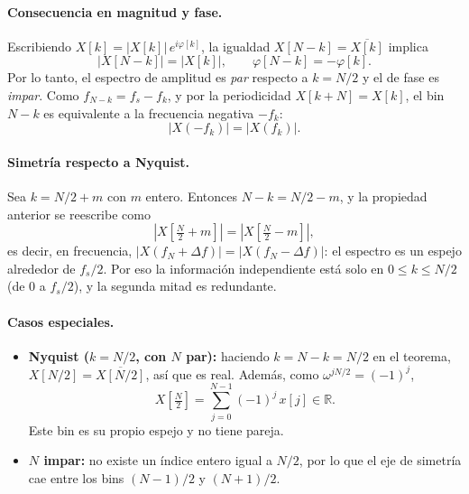 \documentclass[12pt]{article}
\begin{document}
\paragraph{Consecuencia en magnitud y fase.} Escribiendo $X[k] = |X[k]|\,e^{i\varphi[k]}$, la igualdad $X[N-k]=\overline{X[k]}$ implica
\begin{equation}
|X[N-k]| = |X[k]|, \qquad \varphi[N-k] = -\varphi[k].
\end{equation}
Por lo tanto, el espectro de amplitud es \emph{par} respecto a $k=N/2$ y el de fase es \emph{impar}. Como $f_{N-k} = f_s - f_k$, y por la periodicidad $X[k+N]=X[k]$, el bin $N-k$ es equivalente a la frecuencia negativa $-f_k$:
\begin{equation}
|X(-f_k)| = |X(f_k)|.
\end{equation}

\paragraph{Simetría respecto a Nyquist.} Sea $k = N/2 + m$ con $m$ entero. Entonces $N-k = N/2 - m$, y la propiedad anterior se reescribe como
\begin{equation}
\left|X\!\left[\tfrac{N}{2}+m\right]\right| = \left|X\!\left[\tfrac{N}{2}-m\right]\right|,
\end{equation}
es decir, en frecuencia, $|X(f_N + \Delta f)| = |X(f_N - \Delta f)|$: el espectro es un espejo alrededor de $f_s/2$. Por eso la información independiente está solo en $0 \le k \le N/2$ (de $0$ a $f_s/2$), y la segunda mitad es redundante.

\paragraph{Casos especiales.}
\begin{itemize}
    \item \textbf{Nyquist ($k=N/2$, con $N$ par):} haciendo $k=N-k=N/2$ en el teorema, $X[N/2]=\overline{X[N/2]}$, así que es real. Además, como $\omega^{jN/2}=(-1)^j$,
    \begin{equation}
    X\!\left[\tfrac{N}{2}\right] = \sum_{j=0}^{N-1} (-1)^j\,x[j] \in \mathbb{R}.
    \end{equation}
    Este bin es su propio espejo y no tiene pareja.
    \item \textbf{$N$ impar:} no existe un índice entero igual a $N/2$, por lo que el eje de simetría cae entre los bins $(N-1)/2$ y $(N+1)/2$.
\end{itemize}
\end{document}
